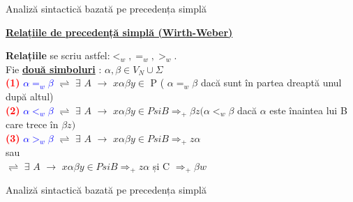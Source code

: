 \documentclass[pdf]{beamer}
\begin{document}
\begin{frame}{Analiză sintactică bazată pe precedența simplă}
\vfill
\begin{center}
\textcolor{ballblue}{\underline{ \textbf{Relațiile de precedență simplă (Wirth-Weber)}}}
\end{center}
\textcolor{ballblue}{\textbf{Relațiile}} se scriu astfel:$ <_{w}, =_{w}, >_{w}.$\\
Fie \textcolor{ballblue}{\textbf{\underline{două simboluri}}} : $ \alpha, \beta \in V_{N} \cup \Sigma$\\
\textcolor{red}{\textbf{(1)}} \textcolor{blue}{\textbf{ $ \alpha =_{w} \beta$ }}  $\rightleftharpoons$ $\exists$ $A$ $\rightarrow$  $x\alpha\beta y \in$ P ( $\alpha =_{w} \beta $ dacă sunt în partea dreaptă unul după altul)\\
\textcolor{red}{\textbf{(2)}} \textcolor{blue}{\textbf{ $ \alpha <_{w} \beta$ }}  $\rightleftharpoons$ $\exists$ $A$ $\rightarrow$  $x\alpha\beta y \in P si B \Rightarrow_{+} \beta z ( \alpha <_{w} \beta$  dacă $\alpha$ este înaintea lui B care trece în $\beta z)$\\
\textcolor{red}{\textbf{(3)}} \textcolor{blue}{\textbf{ $ \alpha >_{w} \beta$ }}   $\rightleftharpoons$ $\exists$ $A$ $\rightarrow$  $x\alpha\beta y \in P si B \Rightarrow_{+} z \alpha$ \\
\hspace{2.2cm} sau\\
\hspace{2.2cm} $\rightleftharpoons$ $\exists$ $A$ $\rightarrow$  $x\alpha\beta y \in P si B \Rightarrow_{+} z \alpha$ și C $\Rightarrow_{+} \beta w $ 

\end{frame}



\begin{frame}{Analiză sintactică bazată pe precedența simplă}

\end{frame}
\end{document}
